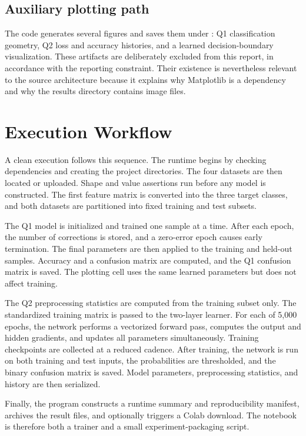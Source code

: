 \documentclass[11pt,a4paper]{article}
\newcommand{\code}[1]{\texttt{\detokenize{#1}}}
\begin{document}
\subsection{Auxiliary plotting path}
The code generates several figures and saves them under \code{results/}: Q1 classification geometry, Q2 loss and accuracy histories, and a learned decision-boundary visualization. These artifacts are deliberately excluded from this report, in accordance with the reporting constraint. Their existence is nevertheless relevant to the source architecture because it explains why Matplotlib is a dependency and why the results directory contains image files.

\section{Execution Workflow}
A clean execution follows this sequence. The runtime begins by checking dependencies and creating the project directories. The four datasets are then located or uploaded. Shape and value assertions run before any model is constructed. The first feature matrix is converted into the three target classes, and both datasets are partitioned into fixed training and test subsets.

The Q1 model is initialized and trained one sample at a time. After each epoch, the number of corrections is stored, and a zero-error epoch causes early termination. The final parameters are then applied to the training and held-out samples. Accuracy and a confusion matrix are computed, and the Q1 confusion matrix is saved. The plotting cell uses the same learned parameters but does not affect training.

The Q2 preprocessing statistics are computed from the training subset only. The standardized training matrix is passed to the two-layer learner. For each of 5,000 epochs, the network performs a vectorized forward pass, computes the output and hidden gradients, and updates all parameters simultaneously. Training checkpoints are collected at a reduced cadence. After training, the network is run on both training and test inputs, the probabilities are thresholded, and the binary confusion matrix is saved. Model parameters, preprocessing statistics, and history are then serialized.

Finally, the program constructs a runtime summary and reproducibility manifest, archives the result files, and optionally triggers a Colab download. The notebook is therefore both a trainer and a small experiment-packaging script.
\end{document}

